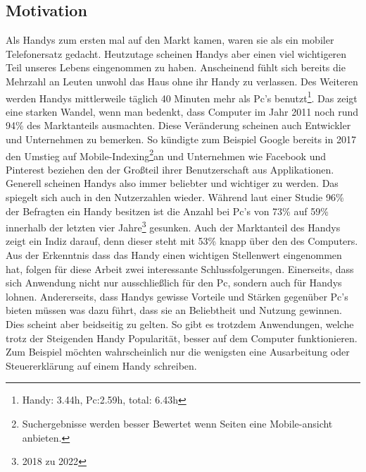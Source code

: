 \subsection{Motivation}\label{subsection:motivation} \myCheckmark
%
Als Handys zum ersten mal auf den Markt kamen, waren sie als ein mobiler Telefonersatz gedacht. Heutzutage scheinen Handys aber einen viel wichtigeren Teil unseres Lebens eingenommen zu haben. Anscheinend fühlt sich bereits die Mehrzahl an Leuten unwohl das Haus ohne ihr Handy zu verlassen\cite{pcVsphone_feelingUneasyWhenLeavingPhoneHome}. Des Weiteren werden Handys mittlerweile täglich 40 Minuten mehr als Pc's benutzt\cite{pcVsphone_phoneScreenTime,pcVsphone_totalScreenTime,pcVsphone_totalScreenTime2}\footnote{Handy: 3.44h, Pc:2.59h, total: 6.43h}. Das zeigt eine starken Wandel, wenn man bedenkt, dass Computer im Jahr 2011 noch rund 94\% des Marktanteils ausmachten\cite{pcVsphone_smartphoneWebTrafficHigherThanPc}. Diese Veränderung scheinen auch Entwickler und Unternehmen zu bemerken. So kündigte zum Beispiel Google bereits in 2017 den Umstieg auf Mobile-Indexing\footnote{Suchergebnisse werden besser Bewertet wenn Seiten eine Mobile-ansicht anbieten.}an\cite{pcVsphone_mobileFirstIndexing} und Unternehmen wie Facebook und Pinterest beziehen den der Großteil ihrer Benutzerschaft aus Applikationen\cite{pcVsphone_socialMediaFacebookMobileUsage,pcVsphone_socialMediaPinterestMobileUsage}.\newline%
Generell scheinen Handys also immer beliebter und wichtiger zu werden. Das spiegelt sich auch in den Nutzerzahlen wieder. Während laut einer Studie 96\% der Befragten ein Handy besitzen ist die Anzahl bei Pc's von 73\% auf 59\% innerhalb der letzten vier Jahre\footnote{2018 zu 2022} gesunken\cite{pcVsphone_deviceOwnership}. Auch der Marktanteil des Handys zeigt ein Indiz darauf, denn dieser steht mit 53\% knapp über den des Computers\cite{pcVsphone_smartphoneWebTrafficHigherThanPc}.%
%
\newline
\myNewSection%
Aus der Erkenntnis dass das Handy einen wichtigen Stellenwert eingenommen hat, folgen für diese Arbeit zwei interessante Schlussfolgerungen.\newline
Einerseits, dass sich Anwendung nicht nur ausschließlich für den Pc, sondern auch für Handys lohnen.\newline%
Andererseits, dass Handys gewisse Vorteile und Stärken gegenüber Pc's bieten müssen was dazu führt, dass sie an Beliebtheit und Nutzung gewinnen. Dies scheint aber beidseitig zu gelten. So gibt es trotzdem Anwendungen, welche trotz der Steigenden Handy Popularität, besser auf dem Computer funktionieren. Zum Beispiel möchten wahrscheinlich nur die wenigsten eine Ausarbeitung oder Steuererklärung auf einem Handy schreiben.%
